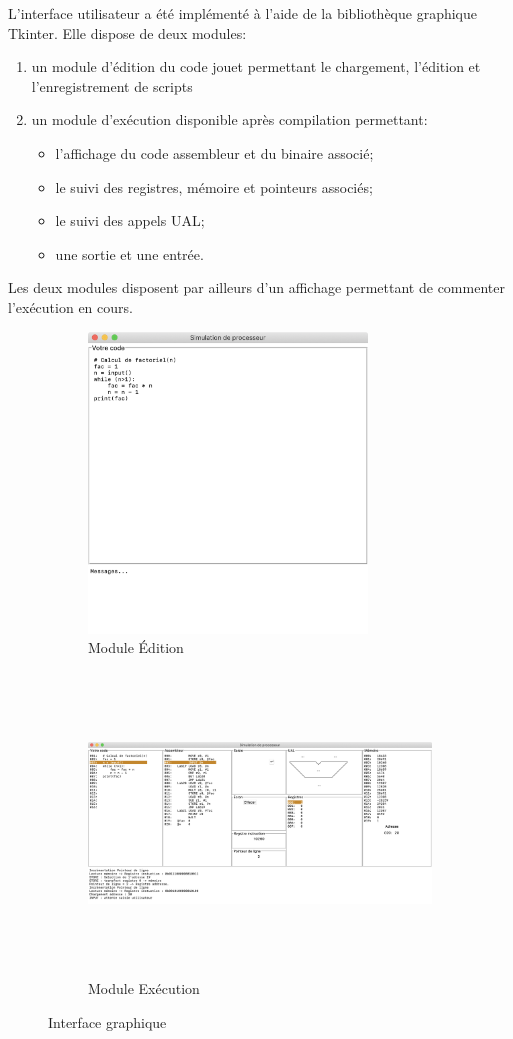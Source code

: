 L'interface utilisateur a été implémenté à l'aide de la bibliothèque graphique Tkinter. Elle dispose de deux modules:
\begin{enumerate}
	\item un module d'édition du code jouet permettant le chargement, l'édition et l'enregistrement de scripts
	\item un module d'exécution disponible après compilation permettant:
	\begin{itemize}
		\item l'affichage du code assembleur et du binaire associé;
		\item le suivi des registres, mémoire et pointeurs associés;
		\item le suivi des appels UAL;
		\item une sortie et une entrée.
	\end{itemize}
\end{enumerate}
Les deux modules disposent par ailleurs d'un affichage permettant de commenter l'exécution en cours.

\begin{figure}[h!]
	\centering
	\begin{subfigure}{\textwidth}
		\centering
		\includegraphics[height=8cm]{./Pictures/EditGUI.png}
		\caption{Module Édition}
	\end{subfigure}
	\begin{subfigure}{\textwidth}
		\centering
	\includegraphics[height=8cm]{./Pictures/ExecGUI.png}
	\caption{Module Exécution}
\end{subfigure}
\caption{Interface graphique}
\end{figure}